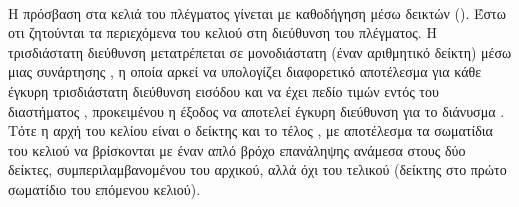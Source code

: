 \paragraph{} Η πρόσβαση στα κελιά του πλέγματος γίνεται με καθοδήγηση μέσω δεικτών
(). Έστω οτι ζητούνται τα περιεχόμενα του κελιού στη διεύθυνση
 του πλέγματος. Η τρισδιάστατη διεύθυνση μετατρέπεται σε μονοδιάστατη (έναν
αριθμητικό δείκτη) μέσω μιας συνάρτησης , η οποία αρκεί να υπολογίζει
διαφορετικό αποτέλεσμα για κάθε έγκυρη τρισδιάστατη διεύθυνση εισόδου και να έχει πεδίο
τιμών εντός του διαστήματος , προκειμένου η έξοδος να αποτελεί
έγκυρη διεύθυνση για το διάνυσμα . Τότε η αρχή του κελίου είναι ο δείκτης
 και το τέλος , με αποτέλεσμα τα σωματίδια
του κελιού να βρίσκονται με έναν απλό βρόχο επανάληψης ανάμεσα στους δύο δείκτες,
συμπεριλαμβανομένου του αρχικού, αλλά όχι του τελικού (δείκτης στο πρώτο σωματίδιο του
επόμενου κελιού).

